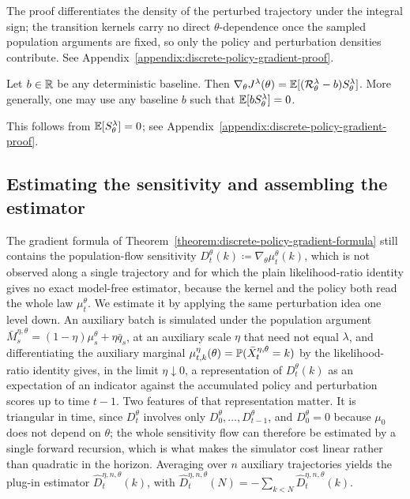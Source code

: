 The proof differentiates the density of the perturbed trajectory under the integral sign; the transition kernels carry no direct $\theta$-dependence once the sampled population arguments are fixed, so only the policy and perturbation densities contribute. See Appendix~\ref{appendix:discrete-policy-gradient-proof}.

\begin{corollary}
    \label{cor:discrete-baseline}
    Let $b\in\R$ be any deterministic baseline. Then $\nabla_\theta J^\lambda(\theta) = \E[(\Rc_\theta^\lambda - b)S_\theta^\lambda]$.
    More generally, one may use any baseline $b$ such that $\E[bS_\theta^\lambda] = 0$.
\end{corollary}

This follows from $\E[S_\theta^\lambda]=0$; see Appendix~\ref{appendix:discrete-policy-gradient-proof}.


\subsection{Estimating the sensitivity and assembling the estimator}
\label{subsec:discrete-estimator}

The gradient formula of Theorem~\ref{theorem:discrete-policy-gradient-formula} still contains the population-flow sensitivity $D_t^\theta(k)\coloneqq\nabla_\theta\mu_t^\theta(k)$, which is not observed along a single trajectory and for which the plain likelihood-ratio identity gives no exact model-free estimator, because the kernel and the policy both read the whole law $\mu_t^\theta$. We estimate it by applying the same perturbation idea one level down. An auxiliary batch is simulated under the population argument $\bar M_s^{\eta,\theta}=(1-\eta)\mu_s^\theta+\eta\bar q_s$, at an auxiliary scale $\eta$ that need not equal $\lambda$, and differentiating the auxiliary marginal $\mu_{t,k}^\eta(\theta)=\P(\bar X_t^{\eta,\theta}=k)$ by the likelihood-ratio identity gives, in the limit $\eta\downarrow0$, a representation of $D_t^\theta(k)$ as an expectation of an indicator against the accumulated policy and perturbation scores up to time $t-1$. Two features of that representation matter. It is triangular in time, since $D_t^\theta$ involves only $D_0^\theta,\ldots,D_{t-1}^\theta$, and $D_0^\theta=0$ because $\mu_0$ does not depend on $\theta$; the whole sensitivity flow can therefore be estimated by a single forward recursion, which is what makes the simulator cost linear rather than quadratic in the horizon. Averaging over $n$ auxiliary trajectories yields the plug-in estimator $\widehat D_t^{\eta,n,\theta}(k)$, with $\widehat D_t^{\eta,n,\theta}(N)=-\sum_{k<N}\widehat D_t^{\eta,n,\theta}(k)$.

